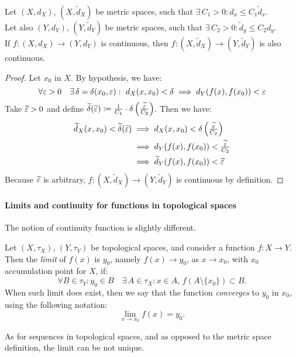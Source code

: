 \begin{prop}
	Let $(X, d_X)$, $(X, \tilde d_X)$ be metric spaces, such that $\exists\, C_1 > 0 : d_x \le C_1 \tilde d_x$. \\
	Let also $(Y, d_Y)$, $(Y, \tilde d_Y)$ be metric spaces, such that $\exists\, C_2 > 0 : \tilde d_y \le C_2 d_y$.\\
	If $f: (X, d_X) \to (Y, d_Y)$ is continuous, then $f: (X, \tilde d_X) \to (Y, \tilde d_Y)$ is also continuous.
\end{prop}

\begin{proof}
	Let $x_0$ in $X$. By hypothesis, we have:
	$$\forall \varepsilon > 0 \quad \exists \, \delta = \delta(x_0, \varepsilon) : \ d_X(x, x_0) < \delta \implies d_Y(f(x), f(x_0)) < \varepsilon$$
	Take $\widetilde{\varepsilon} > 0$ and define $\widetilde\delta(\widetilde{\varepsilon}) \coloneqq \frac{1}{C_1} \cdot \delta \left( \frac{\widetilde{\varepsilon}}{C_2} \right)$. Then we have:
	\begin{align*}
	\widetilde d_X(x, x_0) < \widetilde\delta(\widetilde{\varepsilon})
	&\implies d_X(x, x_0) < \delta \left( \tfrac{\widetilde{\varepsilon}}{C_2} \right) \\
	&\implies d_Y(f(x), f(x_0)) < \tfrac{\widetilde{\varepsilon}}{C_2} \\
	&\implies \widetilde d_Y(f(x), f(x_0)) < \widetilde{\varepsilon}
	\end{align*}
	Because $\widetilde{\varepsilon}$ is arbitrary, $f: (X, \tilde d_X) \to (Y, \tilde d_Y)$ is continuous by definition.
\end{proof}

\paragraph{Limits and continuity for functions in topological spaces} The notion of continuity function is slightly different.
\begin{defn}
	Let $(X, \tau_X)$, $(Y, \tau_Y)$ be topological spaces, and consider a function $f: X \to Y$.\\
	Then the \emph{limit} of $f(x)$ is $y_0$, namely $f(x) \to y_0$, as $x \to x_0$, with $x_0$ accumulation point for $X$, if:
	$$\forall B \in \tau_Y : y_0 \in B \quad \exists \, A \in \tau_X : x \in A, \, f(A \setminus \{x_0\}) \subset B.$$
	When such limit does exist, then we say that the function \emph{converges} to $y_0$ in $x_0$, using the following notation:
	$$ \lim\limits_{x \to x_0}f(x)=y_0.$$
\end{defn}
As for sequences in topological spaces, and as opposed to the metric space definition, the limit can be not unique.

